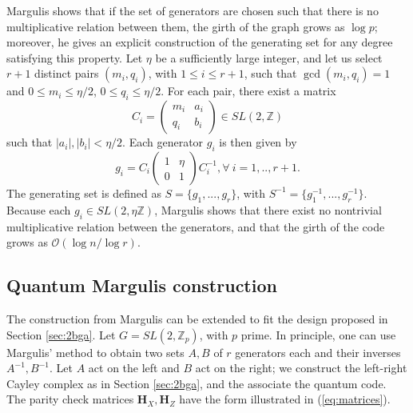 \documentclass[a4paper,twocolumn,11pt,accepted=2026-05-03]{quantumarticle}
\begin{document}
Margulis shows that if the set of generators are chosen such that there is no multiplicative relation between them, the girth of the graph grows as $\log p$; moreover, he gives an explicit construction of the generating set for any degree satisfying this property. Let $\eta$ be a sufficiently large integer, and let us select $r+1$ distinct pairs $(m_i,q_i)$, with $1 \leq i \leq r+1$, such that $\gcd (m_i,q_i) = 1$ and $0 \leq m_i \leq \eta/2$, $0 \leq q_i \leq \eta/2$. For each pair, there exist a matrix
\begin{equation}
    C_i = \begin{pmatrix}
        m_i & a_i \\
        q_i & b_i
    \end{pmatrix} \in SL(2,\mathbb{Z})
\end{equation}
such that $|a_i|,|b_i| < \eta/2$. Each generator $g_i$ is then given by 
\begin{equation}
    g_i = C_i \begin{pmatrix}
        1 & \eta \\
        0 & 1
    \end{pmatrix}C_i^{-1}, \forall\ i=1,..,r+1.
\end{equation}
The generating set is defined as $S = \{g_1,...,g_r\}$, with $S^{-1}=\{g_1^{-1},...,g_r^{-1}\}$. Because each $g_i \in SL(2,\eta\mathbb{Z})$, Margulis shows that there exist no nontrivial multiplicative relation between the generators, and that the girth of the code grows as $\mathcal{O}(\log n / \log r)$.


% 
\subsection{Quantum Margulis construction}
The construction from Margulis can be extended to fit the design proposed in Section \ref{sec:2bga}. Let $G=SL(2,\mathbb{Z}_p)$, with $p$ prime. In principle, one can use Margulis' method to obtain two sets $A,B$ of $r$ generators each and their inverses $A^{-1},B^{-1}$. Let $A$ act on the left and $B$ act on the right; we construct the left-right Cayley complex as in Section \ref{sec:2bga}, and the associate the quantum code. The parity check matrices $\mathbf{H}_X,\mathbf{H}_Z$ have the form illustrated in (\ref{eq:matrices}).
\end{document}
